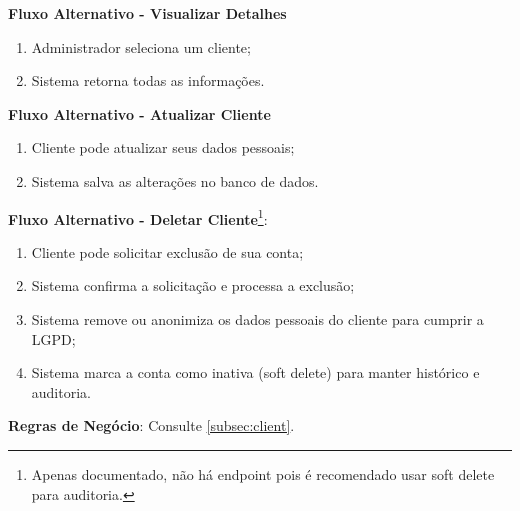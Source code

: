 \begin{itemize}[topsep=1pt, itemsep=0pt]
  \textbf{Fluxo Alternativo - Visualizar Detalhes}
  \begin{enumerate}
    \item Administrador seleciona um cliente;
    \item Sistema retorna todas as informações.
  \end{enumerate}

  \textbf{Fluxo Alternativo - Atualizar Cliente}
  \begin{enumerate}
    \item Cliente pode atualizar seus dados pessoais;
    \item Sistema salva as alterações no banco de dados.
  \end{enumerate}

  \textbf{Fluxo Alternativo - Deletar Cliente}\footnote{Apenas documentado, não há endpoint pois é recomendado usar soft delete para auditoria.}:
  \begin{enumerate}
    \item Cliente pode solicitar exclusão de sua conta;
    \item Sistema confirma a solicitação e processa a exclusão;
    \item Sistema remove ou anonimiza os dados pessoais do cliente para cumprir a LGPD;
    \item Sistema marca a conta como inativa (soft delete) para manter histórico e auditoria.
  \end{enumerate}

  \textbf{Regras de Negócio}:
  Consulte \ref{subsec:client}.

\end{itemize}
